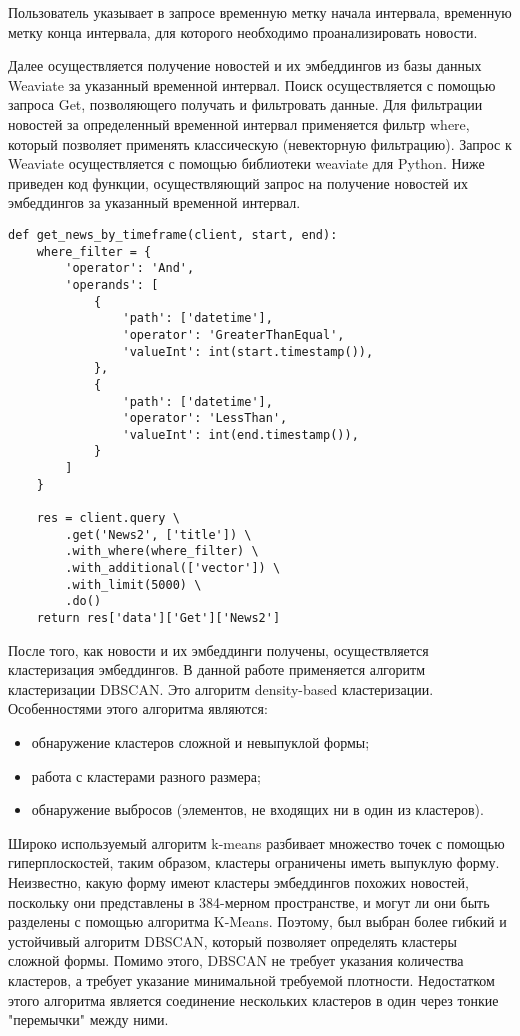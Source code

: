 Пользователь указывает в запросе временную метку начала интервала, временную метку конца интервала, для которого необходимо проанализировать новости.

Далее осуществляется получение новостей и их эмбеддингов из базы данных Weaviate за указанный временной интервал. Поиск осуществляется с помощью запроса Get{}, позволяющего получать и фильтровать данные. Для фильтрации новостей за определенный временной интервал применяется фильтр where, который позволяет применять классическую (невекторную фильтрацию). Запрос к Weaviate осуществляется с помощью библиотеки weaviate для Python. Ниже приведен код функции, осуществляющий запрос на получение новостей их эмбеддингов за указанный временной интервал.

\begin{lstlisting}
def get_news_by_timeframe(client, start, end):
    where_filter = {
        'operator': 'And',
        'operands': [
            {
                'path': ['datetime'],
                'operator': 'GreaterThanEqual',
                'valueInt': int(start.timestamp()),
            },
            {
                'path': ['datetime'],
                'operator': 'LessThan',
                'valueInt': int(end.timestamp()),
            }
        ]
    }

    res = client.query \
        .get('News2', ['title']) \
        .with_where(where_filter) \
        .with_additional(['vector']) \
        .with_limit(5000) \
        .do()
    return res['data']['Get']['News2']
\end{lstlisting}

После того, как новости и их эмбеддинги получены, осуществляется кластеризация эмбеддингов. В данной работе применяется алгоритм кластеризации DBSCAN. Это алгоритм density-based кластеризации. Особенностями этого алгоритма являются:
\begin{itemize}
    \item обнаружение кластеров сложной и невыпуклой формы;
    \item работа с кластерами разного размера;
    \item обнаружение выбросов (элементов, не входящих ни в один из кластеров).
\end{itemize}

Широко используемый алгоритм k-means разбивает множество точек с помощью гиперплоскостей, таким образом, кластеры ограничены иметь выпуклую форму. Неизвестно, какую форму имеют кластеры эмбеддингов похожих новостей, поскольку они представлены в 384-мерном пространстве, и могут ли они быть разделены с помощью алгоритма K-Means. Поэтому, был выбран более гибкий и устойчивый алгоритм DBSCAN, который позволяет определять кластеры сложной формы. Помимо этого, DBSCAN не требует указания количества кластеров, а требует указание минимальной требуемой плотности. Недостатком этого алгоритма является соединение нескольких кластеров в один через тонкие "перемычки" между ними.

